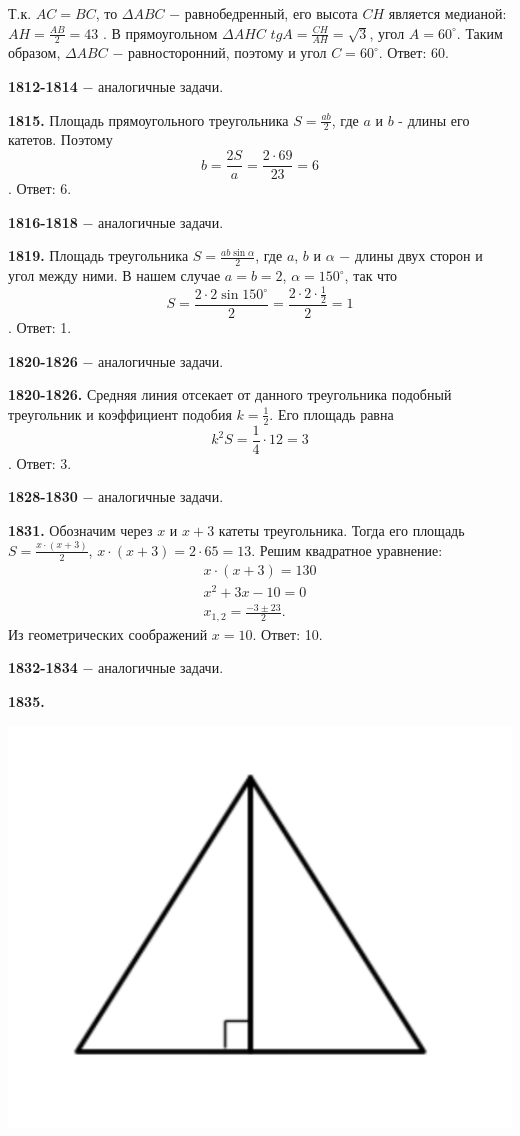 Т.к. $AC=BC$, то $\Delta ABC$ $-$ равнобедренный, его высота $CH$ является медианой: $AH = \frac{AB}{2}=43$ . В прямоугольном $\Delta AHC$ $tgA=\frac{CH}{AH} = \sqrt{3}$, угол $A = 60^\circ$. Таким образом, $\Delta ABC$ $-$ равносторонний, поэтому и угол $C = 60^\circ.$
\newline \null \hspace*{\fill} Ответ: 60.

\textbf{1812-1814} $-$ аналогичные задачи.

\textbf{1815.}  Площадь прямоугольного треугольника $S = \frac{ab}{2}$, где $a$ и \newline $b$ - длины его катетов. Поэтому
\[
b = \frac{2S}{a} = \frac{2 \cdot 69}{23} = 6
\]. \null \hspace*{\fill} Ответ: 6.

\textbf{1816-1818} $-$ аналогичные задачи.

\textbf{1819.} Площадь треугольника $S = \frac{ab\sin{\alpha}}{2}$, где $a$, $b$ и $\alpha$ $-$ длины двух сторон и угол между ними. В нашем случае $a = b = 2$, $\alpha = 150^\circ$, так что
\[
S = \frac{2 \cdot 2 \sin{150^\circ}}{2} = \frac{2 \cdot 2 \cdot \frac{1}{2}}{2} = 1
\].\null \hspace*{\fill} Ответ: 1.

\textbf{1820-1826} $-$ аналогичные задачи.

\textbf{1820-1826.} Средняя линия отсекает от данного треугольника подобный треугольник и коэффициент подобия $k = \frac{1}{2}$. Его площадь равна 
\[
k^2S=\frac{1}{4}\cdot12=3
\].\null \hspace*{\fill} Ответ: 3.

\textbf{1828-1830} $-$ аналогичные задачи.

\textbf{1831.} Обозначим через $x$ и $x+3$ катеты треугольника. Тогда его площадь $S = \frac{x\cdot(x+3)}{2}$, $x\cdot(x+3)=2\cdot65=13$. Решим квадратное уравнение:
\[
\begin{aligned}
	x\cdot(x+3)=130 \\
	 x^2+3x-10=0 \\
	 x_{1,2}=\frac{-3\pm 23}{2}.
\end{aligned}
\]
Из геометрических соображений $x =10$. \newline \null \hspace*{\fill} Ответ: 10.

\textbf{1832-1834} $-$ аналогичные задачи.

\textbf{1835.}

{\centering \includegraphics[width=0.4\linewidth]{Geometry/Content/18.png}
	
}

